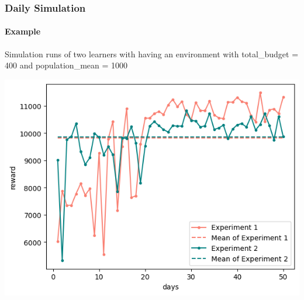 
\begin{frame}

\frametitle{Daily Simulation}
\framesubtitle{Example}

\scriptsize
Simulation runs of two learners with having an environment with total\_budget = 400 and population\_mean = 1000

\begin{center}
    \includegraphics[scale=0.5]{img/Graphs/env_sim/image1.png}
\end{center}


\end{frame}

